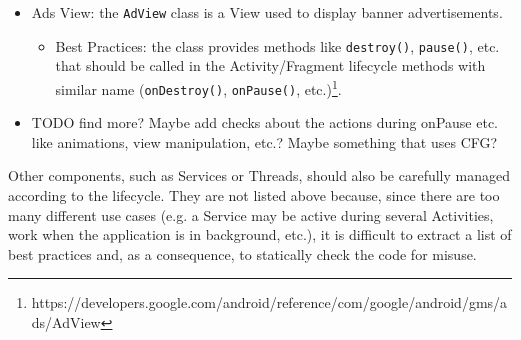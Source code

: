 \documentclass[11pt,a4paper,notitlepage]{article}
\begin{document}
\begin{itemize}
\begin{itemize}
\begin{itemize}
			\end{itemize}
		\end{itemize}
	\item Ads View: the \texttt{AdView} class is a View used to display banner advertisements.
	\begin{itemize}
		\item Best Practices: the class provides methods like \texttt{destroy()}, \texttt{pause()}, etc. that should be called in the Activity/Fragment lifecycle methods with similar name (\texttt{onDestroy()}, \texttt{onPause()}, etc.)\footnote{https://developers.google.com/android/reference/com/google/android/gms/ads/AdView}.
	\end{itemize}
	\item TODO find more? Maybe add checks about the actions during onPause etc. like animations, view manipulation, etc.? Maybe something that uses CFG?
\end{itemize}\medskip
Other components, such as Services or Threads, should also be carefully managed according to the lifecycle. They are not listed above because, since there are too many different use cases (e.g. a Service may be active during several Activities, work when the application is in background, etc.), it is difficult to extract a list of best practices and, as a consequence, to statically check the code for misuse.
\end{document}
